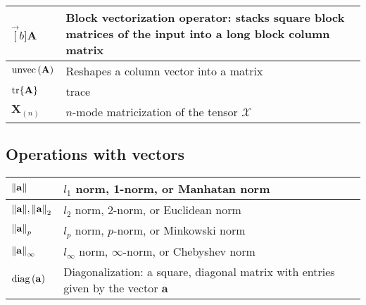 \documentclass{article}
\begin{document}
\begin{xltabular}{\textwidth}{XX}
    \(\vec[b]{\mathbf{A}}\)                                           & Block vectorization operator: stacks square block matrices of the input into a long block column matrix\\ \hline
    \(\operatorname{unvec}\left(\mathbf{A}\right)\)                                            & Reshapes a column vector into a matrix\\ \hline
    \(\tr{\mathbf{A}}\)                                               & trace\\ \hline
    \(\mathbf{X}_{(n)}\)                                              & \(n\)-mode matricization of the tensor \(\bm{\mathcal{X}}\)\\
\end{xltabular}
\subsection{Operations with vectors}
\begin{xltabular}{\textwidth}{XX}
    \(\norm{\mathbf{a}}\)                         & \(l_1\) norm, 1-norm, or Manhatan norm\\ \hline
    \(\norm{\mathbf{a}}, \norm{\mathbf{a}}_2\)    & \(l_2\) norm, 2-norm, or Euclidean norm\\ \hline
    \(\norm{\mathbf{a}}_p\)                       & \(l_p\) norm, \(p\)-norm, or Minkowski norm\\ \hline
    \(\norm{\mathbf{a}}_\infty\)                  & \(l_\infty\) norm, \(\infty\)-norm, or Chebyshev norm\\ \hline
    \(\operatorname{diag}\left(\mathbf{a}\right)\)                         & Diagonalization: a square, diagonal matrix with entries given by the vector \(\mathbf{a}\)\\
\end{xltabular}
\end{document}
